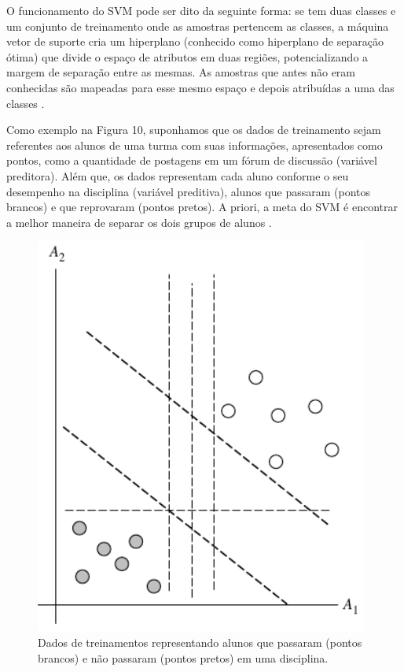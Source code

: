 \par
O funcionamento do SVM pode ser dito da seguinte forma: se tem duas classes e um conjunto de treinamento onde as amostras pertencem as classes, a máquina vetor de suporte cria um hiperplano (conhecido como hiperplano de separação ótima) que divide o espaço de atributos em duas regiões, potencializando a margem de separação entre as mesmas. As amostras que antes não eram conhecidas são mapeadas para esse mesmo espaço e depois atribuídas a uma das classes \cite{Henke2011}.


\par
Como exemplo na Figura 10, suponhamos que os dados de treinamento sejam referentes aos alunos de uma turma com suas informações, apresentados como pontos, como a quantidade de postagens em um fórum de discussão (variável preditora). Além que, os dados representam cada aluno conforme o seu desempenho na disciplina (variável preditiva), alunos que passaram (pontos brancos) e que reprovaram (pontos pretos). A priori, a meta do SVM é encontrar a melhor maneira de separar os dois grupos de alunos \cite{Costa2012}.


\begin{figure}[!htp]
	\begin{center}
    \caption{\label{fig:waveform_fig} Dados de treinamentos representando alunos que passaram (pontos brancos) e não passaram (pontos pretos) em uma disciplina.}
	\includegraphics[scale=0.50]{Figuras/SVM.png}
	\end{center}
\end{figure}

